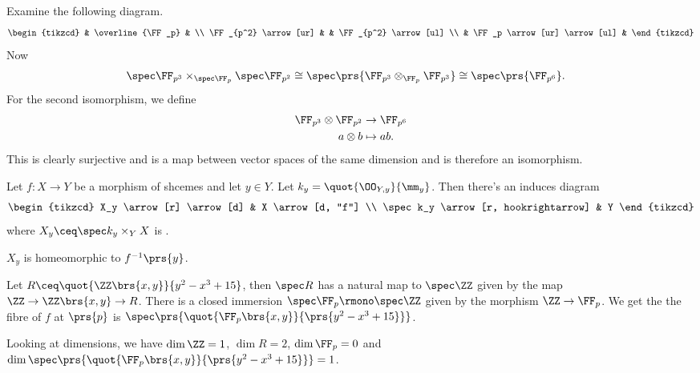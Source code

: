 \documentclass[10pt,a4paper,twoside,openany,hidelinks]{book}
\begin{document}
\begin{example}
Examine the following diagram.
$$
\begin{tikzcd}
& \overline{\FF_p} & \\
\FF_{p^2} \arrow[ur] & & \FF_{p^2} \arrow[ul] \\
& \FF_p \arrow[ur] \arrow[ul] &
\end{tikzcd}
$$
Now
\begin{align*}
    \spec \FF_{p^3} \times_{\spec \FF_p} \spec \FF_{p^2} &\cong \spec\prs{\FF_{p^3} \otimes_{\FF_p} \FF_{p^3}} \cong \spec\prs{\FF_{p^6}} \text{.}
\end{align*}
For the second isomorphism, we define
\begin{align*}
    \FF_{p^3} \otimes \FF_{p^2} &\to \FF_{p^6} \\
    a \otimes b &\mapsto ab \text{.}
\end{align*}
This is clearly surjective and is a map between vector spaces of the same dimension and is therefore an isomorphism.
\end{example}

\begin{definition}[Fibres]
Let $f \colon X \to Y$ be a morphism of shcemes and let $y \in Y$. Let $k_y = \quot{\OO_{Y,y}}{\mm_y}$. Then
there's an induces diagram
$$
\begin{tikzcd}
X_y \arrow[r] \arrow[d] & X \arrow[d, "f"] \\ \spec k_y \arrow[r, hookrightarrow] & Y
\end{tikzcd}
$$
where $X_y \ceq \spec k_y \times_Y X$ is .
\end{definition}


\begin{exercise}
$X_y$ is homeomorphic to $f^{-1}\prs{y}$.
\end{exercise}

\begin{example}
Let $R \ceq \quot{\ZZ\brs{x,y}}{y^2 - x^3 + 15}$, then $\spec R$ has a natural map to $\spec \ZZ$ given by the map $\ZZ \to \ZZ\brs{x,y} \to R$.
There is a closed immersion $\spec \FF_p \rmono \spec \ZZ$ given by the morphism $\ZZ \to \FF_p$.
We get the the fibre of $f$ at $\prs{p}$ is $\spec \prs{\quot{\FF_p\brs{x,y}}{\prs{y^2 - x^3 + 15}}}$.

Looking at dimensions, we have $\dim \ZZ = 1$, $\dim R = 2$, $\dim \FF_p = 0$ and $\dim \spec \prs{\quot{\FF_p\brs{x,y}}{\prs{y^2 - x^3 + 15}}} = 1$.
\end{example}
\end{document}
